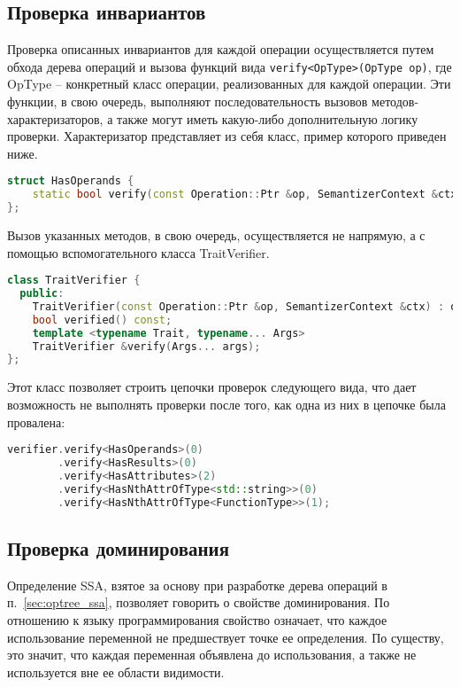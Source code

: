\subsection{Проверка инвариантов}

Проверка описанных инвариантов для каждой операции осуществляется путем обхода дерева операций и вызова функций вида \verb|verify<OpType>(OpType op)|, где OpType -- конкретный класс операции, реализованных для каждой операции.
Эти функции, в свою очередь, выполняют последовательность вызовов методов-характеризаторов, а также могут иметь какую-либо дополнительную логику проверки.
Характеризатор представляет из себя класс, пример которого приведен ниже.

\begin{lstlisting}[language=C++, caption=Пример класса-характеризатора]
struct HasOperands {
    static bool verify(const Operation::Ptr &op, SemantizerContext &ctx, size_t numOperands);
};
\end{lstlisting}

Вызов указанных методов, в свою очередь, осуществляется не напрямую, а с помощью вспомогательного класса TraitVerifier.

\begin{lstlisting}[language=C++, caption=Интерфейс класса TraitVerifier]
class TraitVerifier {
  public:
    TraitVerifier(const Operation::Ptr &op, SemantizerContext &ctx) : op(op), ctx(ctx), acc(true){};
    bool verified() const;
    template <typename Trait, typename... Args>
    TraitVerifier &verify(Args... args);
};
\end{lstlisting}

Этот класс позволяет строить цепочки проверок следующего вида, что дает возможность не выполнять проверки после того, как одна из них в цепочке была провалена:

\begin{lstlisting}[language=C++, caption=Пример семантической верификации]
verifier.verify<HasOperands>(0)
        .verify<HasResults>(0)
        .verify<HasAttributes>(2)
        .verify<HasNthAttrOfType<std::string>>(0)
        .verify<HasNthAttrOfType<FunctionType>>(1);
\end{lstlisting}

\subsection{Проверка доминирования}

Определение SSA, взятое за основу при разработке дерева операций в п.~\ref{sec:optree_ssa}, позволяет говорить о свойстве доминирования.
По отношению к языку программирования свойство означает, что каждое использование переменной не предшествует точке ее определения.
По существу, это значит, что каждая переменная объявлена до использования, а также не используется вне ее области видимости.

